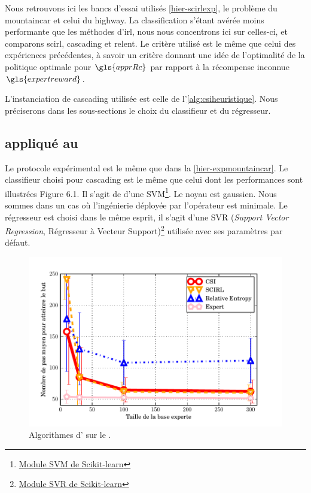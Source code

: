 \documentclass[frenchb,a4paper,justified,notoc]{tufte-book}
\newcommand{\apprRc}{\gls{apprRc}}
\newcommand{\expertreward}{\gls{expertreward}}
\begin{document}
Nous retrouvons ici les bancs d'essai utilisés \autoref{hier-scirlexp}, le problème du \gls{mountaincar} et celui du \gls{highway}. La classification s'étant avérée moins performante que les méthodes d'\gls{irl}, nous nous concentrons ici sur celles-ci, et comparons \gls{scirl}, \gls{cascading} et \gls{relent}. Le critère utilisé est le même que celui des expériences précédentes, à savoir un critère donnant une idée de l'optimalité de la politique optimale pour $\apprRc$ par rapport à la récompense inconnue $\expertreward$.

L'instanciation de \gls{cascading} utilisée est celle de l'\autoref{alg:csiheuristique}. Nous préciserons dans les sous-sections le choix du classifieur et du régresseur.
\subsection{ appliqué au }
\label{sec-6-3-2}

Le protocole expérimental est le même que dans la \autoref{hier-expmountaincar}. Le classifieur choisi pour \gls{cascading} est le même que celui dont les performances sont illustrées Figure 6.1.
Il s'agit de d'une SVM\footnote{\href{http://scikit-learn.org/stable/modules/generated/sklearn.svm.SVC.html}{Module SVM de Scikit-learn}
 }. Le noyau est gaussien. Nous sommes dans un cas où l'ingénierie déployée par l'opérateur est minimale. Le régresseur est choisi dans le même esprit, il s'agit d'une SVR (\emph{Support Vector Regression}, Régresseur à Vecteur Support)\footnote{\href{http://scikit-learn.org/stable/modules/generated/sklearn.svm.SVR.html}{Module SVR de Scikit-learn}
 } utilisée avec ses paramètres par défaut. 

\begin{figure}
\centering
\includegraphics[width=\textwidth]{Figures/mountain_car_csi.pdf}
\caption{Algorithmes d' sur le .}
\label{fig:csimountaincar}
\end{figure}
\end{document}
